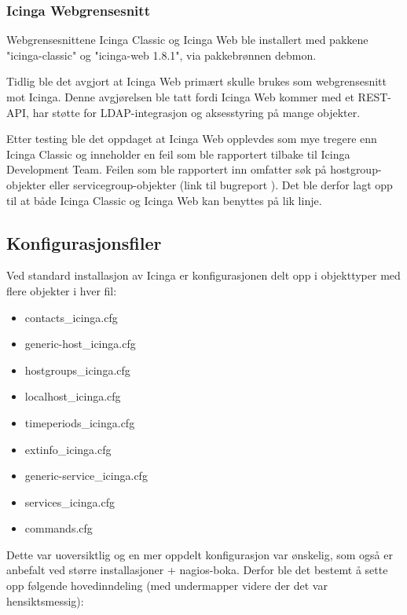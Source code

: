 \subsubsection{Icinga Webgrensesnitt}
Webgrensesnittene Icinga Classic og Icinga Web ble installert med pakkene "icinga-classic" og "icinga-web 1.8.1", via pakkebrønnen debmon. 

Tidlig ble det avgjort at Icinga Web primært skulle brukes som webgrensesnitt mot Icinga. Denne avgjørelsen ble tatt fordi Icinga Web kommer med et REST-API, har støtte for LDAP-integrasjon og aksesstyring på mange objekter.

Etter testing ble det oppdaget at Icinga Web opplevdes som mye tregere enn Icinga Classic og inneholder en feil som ble rapportert tilbake til Icinga Development Team. Feilen som ble rapportert inn omfatter søk på hostgroup-objekter eller servicegroup-objekter (link til bugreport \cite{icingawebbug}). Det ble derfor lagt opp til at både Icinga Classic og Icinga Web kan benyttes på lik linje.
\subsection{Konfigurasjonsfiler}
Ved standard installasjon av Icinga er konfigurasjonen delt opp i objekttyper med flere objekter i hver fil:
\begin{itemize}
\item contacts\_icinga.cfg  
\item generic-host\_icinga.cfg     
\item hostgroups\_icinga.cfg  
\item localhost\_icinga.cfg  
\item timeperiods\_icinga.cfg
\item extinfo\_icinga.cfg   
\item generic-service\_icinga.cfg   
\item services\_icinga.cfg
\item commands.cfg
\end{itemize}
Dette var uoversiktlig og en mer oppdelt konfigurasjon var ønskelig, som også er anbefalt ved større installasjoner \cite{sysadmin} + nagios-boka. Derfor ble det bestemt å sette opp følgende hovedinndeling (med undermapper videre der det var hensiktsmessig):

\makeatletter
\newcount\dirtree@lvl
\newcount\dirtree@plvl
\newcount\dirtree@clvl
\def\dirtree@growth{%
  \ifnum\tikznumberofcurrentchild=1\relax
  \global\advance\dirtree@plvl by 1
  \expandafter\xdef\csname dirtree@p@\the\dirtree@plvl\endcsname{\the\dirtree@lvl}
  \fi
  \global\advance\dirtree@lvl by 1\relax
  \dirtree@clvl=\dirtree@lvl
  \advance\dirtree@clvl by -\csname dirtree@p@\the\dirtree@plvl\endcsname
  \pgf@xa=0.5cm\relax
  \pgf@ya=-0.5cm\relax
  \pgf@ya=\dirtree@clvl\pgf@ya
  \pgftransformshift{\pgfqpoint{\the\pgf@xa}{\the\pgf@ya}}%
  \ifnum\tikznumberofcurrentchild=\tikznumberofchildren
  \global\advance\dirtree@plvl by -1
  \fi
}

